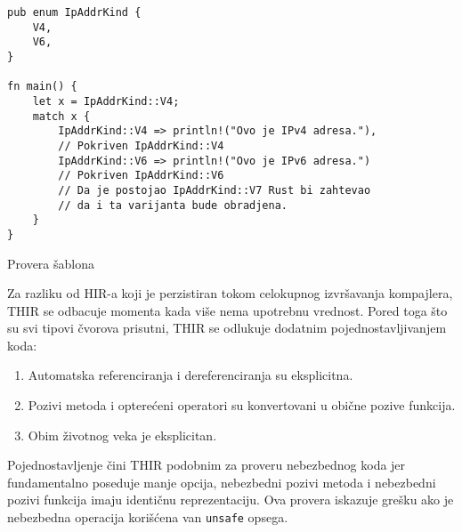 \begin{listing}[H]
\begin{verbatim}
pub enum IpAddrKind {
    V4,
    V6,
}

fn main() {
    let x = IpAddrKind::V4;
    match x {
        IpAddrKind::V4 => println!("Ovo je IPv4 adresa."), 
        // Pokriven IpAddrKind::V4
        IpAddrKind::V6 => println!("Ovo je IPv6 adresa.") 
        // Pokriven IpAddrKind::V6
        // Da je postojao IpAddrKind::V7 Rust bi zahtevao 
        // da i ta varijanta bude obradjena.
    }
}
\end{verbatim}
\caption{Provera šablona}
\label{lst:pattern_matching}
\end{listing}

Za razliku od HIR-a koji je perzistiran tokom celokupnog izvršavanja kompajlera, THIR se odbacuje momenta
kada više nema upotrebnu vrednost. Pored toga što su svi tipovi čvorova prisutni, THIR se odlukuje dodatnim 
pojednostavljivanjem koda:
\begin{enumerate}
    \item Automatska referenciranja i dereferenciranja su eksplicitna.
    \item Pozivi metoda i opterećeni operatori su konvertovani u obične pozive funkcija. 
    \item Obim životnog veka je eksplicitan.
\end{enumerate}

Pojednostavljenje čini THIR podobnim za proveru nebezbednog koda jer fundamentalno poseduje manje opcija, 
nebezbedni pozivi metoda i nebezbedni pozivi funkcija imaju identičnu reprezentaciju. Ova provera 
iskazuje grešku ako je nebezbedna operacija korišćena van \verb|unsafe| opsega.

